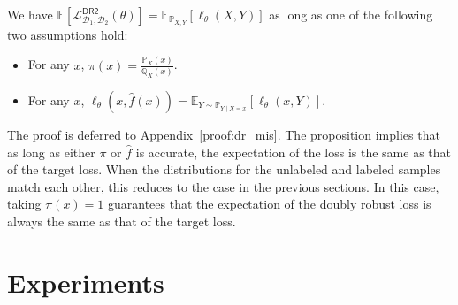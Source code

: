 \begin{proposition}\label{prop:dr_mis}
We have $ \mathbb{E}[\mathcal{L}^{\mathsf{DR2}}_{\mathcal{D}_1,\mathcal{D}_2}(\theta) ] = \mathbb{E}_{\mathbb{P}_{X, Y}}[\ell_\theta(X, Y)]$ as long as one of the following two assumptions hold:
        \begin{itemize}
            \item For any $x$, $\pi(x) = \frac{\mathbb{P}_X(x)}{\mathbb{Q}_X(x)}$.
            \item For any $x$, $\ell_\theta(x, \hat f(x))  = \mathbb{E}_{ Y\sim \mathbb{P}_{Y\mid X=x}}[\ell_\theta(x, Y)]$.
        \end{itemize}
\end{proposition}
The proof is deferred to Appendix~\ref{proof:dr_mis}. 
The proposition implies that  as long as either $\pi$ or 
$\hat f$ is accurate, the expectation of the loss is the same as that of the target loss. When the distributions for the unlabeled and labeled samples match each other, this reduces to the case in the previous sections. In this case, taking $\pi(x)=1$ guarantees that the expectation of the doubly robust loss is always the same as that of the target loss. 
\section{Experiments}\label{sec:empirical}


